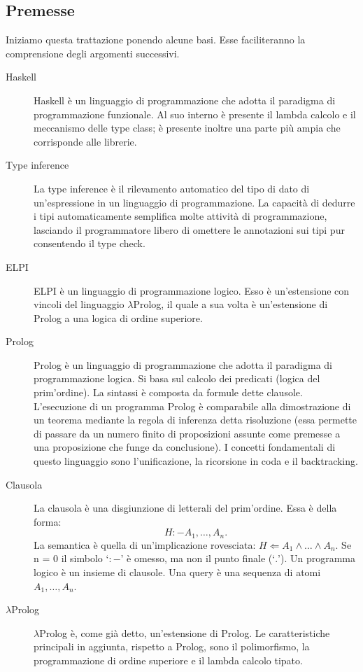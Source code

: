 \documentclass[12pt,a4paper,openright,twoside]{report}
\begin{document}
\subsection{Premesse}
Iniziamo questa trattazione ponendo alcune basi. Esse faciliteranno la comprensione degli argomenti successivi.
\begin{description}
 \item[Haskell] Haskell è un linguaggio di programmazione che adotta il paradigma di programmazione funzionale. Al suo interno è presente il lambda calcolo e il meccanismo delle type class; è presente inoltre una parte più ampia che corrisponde alle librerie.
 \item[Type inference] La type inference è il rilevamento automatico del tipo di dato di un'espressione in un linguaggio di programmazione. La capacità di dedurre i tipi automaticamente semplifica molte attività di programmazione, lasciando il programmatore libero di omettere le annotazioni sui tipi pur consentendo il type check.
 \item[ELPI] ELPI è un linguaggio di programmazione logico. Esso è un'estensione con vincoli del linguaggio $\lambda$Prolog, il quale a sua volta è un'estensione di Prolog a una logica di ordine superiore.
 \item[Prolog] Prolog è un linguaggio di programmazione che adotta il paradigma di programmazione logica. Si basa sul calcolo dei predicati (logica del prim'ordine). La sintassi è composta da formule dette clausole. L'esecuzione di un programma Prolog è comparabile alla dimostrazione di un teorema mediante la regola di inferenza detta risoluzione (essa permette di passare da un numero finito di proposizioni assunte come premesse a una proposizione che funge da conclusione). I concetti fondamentali di questo linguaggio sono l'unificazione, la ricorsione in coda e il backtracking.
 \item[Clausola] La clausola è una disgiunzione di letterali del prim'ordine. Essa è della forma:
 \begin{equation}
  H :- A_1,\ldots,A_n.
 \end{equation}
 La semantica è quella di un'implicazione rovesciata: $H \Leftarrow A_1 \wedge \ldots \wedge A_n$. Se n = 0 il simbolo `$:-$' è omesso, ma non il punto finale (`$.$'). Un programma logico è un insieme di clausole. Una query è una sequenza di atomi $A_1,\ldots,A_n$.
 \item[$\lambda$Prolog] $\lambda$Prolog è, come già detto, un'estensione di Prolog. Le caratteristiche principali in aggiunta, rispetto a Prolog, sono il polimorfismo, la programmazione di ordine superiore e il lambda calcolo tipato.
\end{description}
\end{document}

